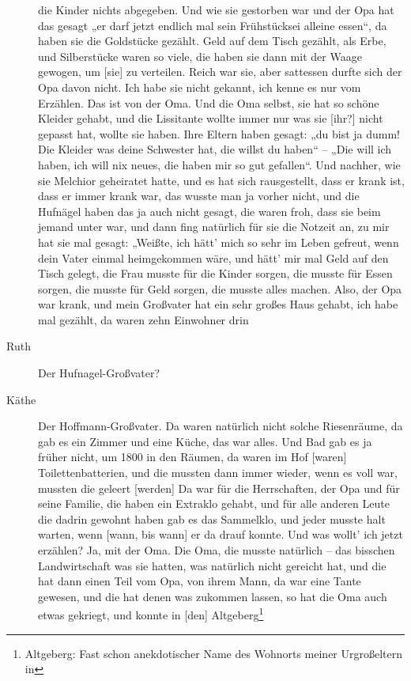 \documentclass[ngerman,]{article}
\begin{document}
\begin{multicols}{3}
\begin{description}
die Kinder nichts abgegeben. Und wie sie gestorben war und der Opa hat
das gesagt „er darf jetzt endlich mal sein Frühstücksei alleine essen“,
da haben sie die Goldstücke gezählt. Geld auf dem Tisch gezählt, als
Erbe, und Silberstücke waren so viele, die haben sie dann mit der Waage
gewogen, um {[}sie{]} zu verteilen. Reich war sie, aber sattessen durfte
sich der Opa davon nicht. Ich habe sie nicht gekannt, ich kenne es nur
vom Erzählen. Das ist von der Oma. Und die Oma selbst, sie hat so schöne
Kleider gehabt, und die Lissitante wollte immer nur was sie {[}ihr?{]}
nicht gepasst hat, wollte sie haben. Ihre Eltern haben gesagt: „du bist
ja dumm! Die Kleider was deine Schwester hat, die willst du haben“ –
„Die will ich haben, ich will nix neues, die haben mir so gut gefallen“.
Und nachher, wie sie Melchior geheiratet hatte, und es hat sich
rausgestellt, dass er krank ist, dass er immer krank war, das wusste man
ja vorher nicht, und die Hufnägel haben das ja auch nicht gesagt, die
waren froh, dass sie beim jemand unter war, und dann fing natürlich für
sie die Notzeit an, zu mir hat sie mal gesagt: „Weißte, ich hätt' mich
so sehr im Leben gefreut, wenn dein Vater einmal heimgekommen wäre, und
hätt' mir mal Geld auf den Tisch gelegt, die Frau musste für die Kinder
sorgen, die musste für Essen sorgen, die musste für Geld sorgen, die
musste alles machen. Also, der Opa war krank, und mein Großvater hat ein
sehr großes Haus gehabt, ich habe mal gezählt, da waren zehn Einwohner
drin
\item[Ruth]
Der Hufnagel-Großvater?
\item[Käthe]
Der Hoffmann-Großvater. Da waren natürlich nicht solche Riesenräume, da
gab es ein Zimmer und eine Küche, das war alles. Und Bad gab es ja
früher nicht, um 1800 in den Räumen, da waren im Hof {[}waren{]}
Toilettenbatterien, und die mussten dann immer wieder, wenn es voll war,
mussten die geleert {[}werden{]} Da war für die Herrschaften, der Opa
und für seine Familie, die haben ein Extraklo gehabt, und für alle
anderen Leute die dadrin gewohnt haben gab es das Sammelklo, und jeder
musste halt warten, wenn {[}wann, bis wann{]} er da drauf konnte. Und
was wollt' ich jetzt erzählen? Ja, mit der Oma. Die Oma, die musste
natürlich – das bisschen Landwirtschaft was sie hatten, was natürlich
nicht gereicht hat, und die hat dann einen Teil vom Opa, von ihrem Mann,
da war eine Tante gewesen, und die hat denen was zukommen lassen, so hat
die Oma auch etwas gekriegt, und konnte in {[}den{]} Altgeberg\footnote{Altgeberg:
  Fast schon anekdotischer Name des Wohnorts meiner Urgroßeltern in
}
\end{description}
\end{multicols}
\end{document}

